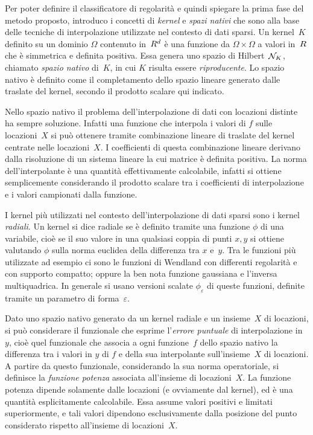 Per poter definire il classificatore di regolarità e quindi spiegare la prima fase del metodo proposto, introduco i concetti di {\em kernel} e {\em spazi nativi} che sono alla base delle tecniche di interpolazione utilizzate nel contesto di dati sparsi.
Un kernel~$K$ definito su un dominio $\Omega$ contenuto in~$R^d$ è una funzione da $\Omega{\times}\Omega$ a valori in~$R$ che è simmetrica e definita positiva.  Essa genera uno spazio di Hilbert~${\cal N}_K$, chiamato {\em spazio nativo} di~$K$, in cui $K$ risulta essere {\em riproducente}.
Lo spazio nativo è definito come il completamento dello spazio lineare generato dalle traslate del kernel, secondo il prodotto scalare qui  indicato.

Nello spazio nativo il problema dell'interpolazione di dati con locazioni distinte ha sempre soluzione.  Infatti una funzione che interpola i valori di $f$ sulle locazioni~$X$ si può ottenere tramite combinazione lineare di traslate del kernel centrate nelle locazioni~$X$.   I coefficienti di questa combinazione lineare derivano dalla risoluzione di un sistema lineare la cui matrice è definita positiva.
 La norma dell’interpolante  è una quantità effettivamente calcolabile, infatti si ottiene semplicemente considerando il prodotto scalare tra i coefficienti di interpolazione e i valori campionati dalla funzione.





I kernel più utilizzati nel contesto dell'interpolazione di dati sparsi sono i kernel {\em radiali}.  Un kernel si dice radiale se è definito tramite una funzione $\phi$ di una variabile, cioè se il suo valore in una qualsiasi coppia di punti $x,y$ si ottiene valutando $\phi$ sulla norma euclidea della differenza tra $x$ e~$y$.  
Tra le funzioni più utilizzate ad esempio ci sono le funzioni di Wendland con differenti regolarità e con supporto compatto; oppure la ben nota funzione gaussiana e l'inversa multiquadrica.
In generale si usano versioni scalate $\phi_\varepsilon$ di queste funzioni, definite tramite un parametro di forma~$\varepsilon$.



Dato uno spazio nativo generato da un kernel radiale e un insieme~$X$ di locazioni, si può considerare il funzionale che esprime l'{\em errore puntuale} di interpolazione in~$y$, cioè quel funzionale che associa a ogni funzione~$f$ dello spazio nativo la differenza tra i valori in $y$ di $f$ e della sua interpolante sull'insieme~$X$ di locazioni.  A partire da questo funzionale, considerando la sua norma operatoriale, si definisce la {\em funzione potenza} associata all'insieme di locazioni~$X$.  La funzione potenza dipende solamente dalle locazioni (e ovviamente dal kernel), ed è una quantità esplicitamente calcolabile.  Essa assume valori positivi e limitati superiormente, e tali valori dipendono esclusivamente dalla posizione del punto considerato rispetto all'insieme di locazioni~$X$.

